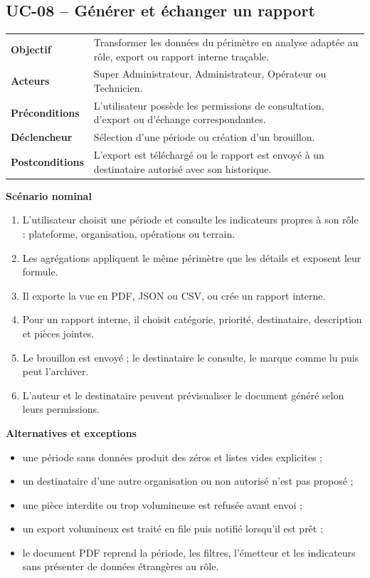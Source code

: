 \subsection{UC-08 -- Générer et échanger un rapport}

\begin{table}[H]
  \centering
  \begin{tabularx}{\textwidth}{@{}C{3.3cm}Y@{}}
    \toprule
    \textbf{Objectif} & Transformer les données du périmètre en analyse adaptée au
    rôle, export ou rapport interne traçable.\\
    \textbf{Acteurs} & Super Administrateur, Administrateur, Opérateur ou Technicien.\\
    \textbf{Préconditions} & L'utilisateur possède les permissions de consultation,
    d'export ou d'échange correspondantes.\\
    \textbf{Déclencheur} & Sélection d'une période ou création d'un brouillon.\\
    \textbf{Postconditions} & L'export est téléchargé ou le rapport est envoyé à un
    destinataire autorisé avec son historique.\\
    \bottomrule
  \end{tabularx}
\end{table}

\textbf{Scénario nominal}
\begin{enumerate}[leftmargin=8mm]
  \item L'utilisateur choisit une période et consulte les indicateurs propres à son
  rôle : plateforme, organisation, opérations ou terrain.
  \item Les agrégations appliquent le même périmètre que les détails et exposent leur
  formule.
  \item Il exporte la vue en PDF, JSON ou CSV, ou crée un rapport interne.
  \item Pour un rapport interne, il choisit catégorie, priorité, destinataire,
  description et pièces jointes.
  \item Le brouillon est envoyé ; le destinataire le consulte, le marque comme lu puis
  peut l'archiver.
  \item L'auteur et le destinataire peuvent prévisualiser le document généré selon
  leurs permissions.
\end{enumerate}

\textbf{Alternatives et exceptions}
\begin{itemize}[leftmargin=7mm]
  \item une période sans données produit des zéros et listes vides explicites ;
  \item un destinataire d'une autre organisation ou non autorisé n'est pas proposé ;
  \item une pièce interdite ou trop volumineuse est refusée avant envoi ;
  \item un export volumineux est traité en file puis notifié lorsqu'il est prêt ;
  \item le document PDF reprend la période, les filtres, l'émetteur et les indicateurs
  sans présenter de données étrangères au rôle.
\end{itemize}
